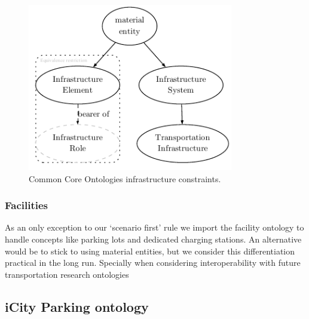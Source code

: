 \begin{figure}[h]
    \centering
    \includegraphics[width=0.8\textwidth]{images/infrastructureSystem}
    \caption{Common Core Ontologies infrastructure constraints.}
    \label{infrastructurefigs} 
\end{figure}

\subsubsection{Facilities}

As an only exception to our `scenario first' rule we import the facility
ontology to handle concepts like parking lots and dedicated charging stations.
An alternative would be to stick to using material entities, but we consider
this differentiation practical in the long run. Specially when considering
interoperability with future transportation research ontologies


\subsection{iCity Parking ontology}

